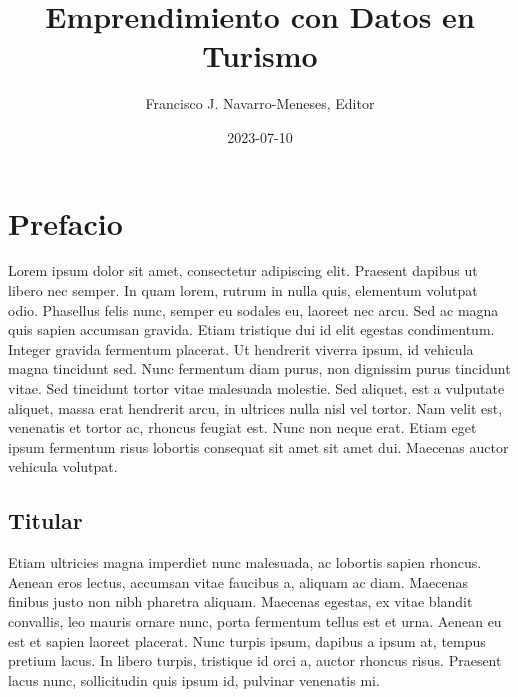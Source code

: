 \documentclass[
  letterpaper,
  DIV=11,
  numbers=noendperiod]{scrreprt}
\title{Emprendimiento con Datos en Turismo}
\author{Francisco J. Navarro-Meneses, Editor}
\date{2023-07-10}
\renewcommand*\contentsname{Table of contents}
\newcommand\contentsname{Table of contents}
\begin{document}
\maketitle
\ifdefined\Shaded\renewenvironment{Shaded}{\begin{tcolorbox}[interior hidden, enhanced, sharp corners, borderline west={3pt}{0pt}{shadecolor}, breakable, boxrule=0pt, frame hidden]}{\end{tcolorbox}}\fi

\renewcommand*\contentsname{Table of contents}
{
\hypersetup{linkcolor=}
\setcounter{tocdepth}{2}
\tableofcontents
}

\hypertarget{prefacio}{%
\chapter*{Prefacio}\label{prefacio}}


Lorem ipsum dolor sit amet, consectetur adipiscing elit. Praesent
dapibus ut libero nec semper. In quam lorem, rutrum in nulla quis,
elementum volutpat odio. Phasellus felis nunc, semper eu sodales eu,
laoreet nec arcu. Sed ac magna quis sapien accumsan gravida. Etiam
tristique dui id elit egestas condimentum. Integer gravida fermentum
placerat. Ut hendrerit viverra ipsum, id vehicula magna tincidunt sed.
Nunc fermentum diam purus, non dignissim purus tincidunt vitae. Sed
tincidunt tortor vitae malesuada molestie. Sed aliquet, est a vulputate
aliquet, massa erat hendrerit arcu, in ultrices nulla nisl vel tortor.
Nam velit est, venenatis et tortor ac, rhoncus feugiat est. Nunc non
neque erat. Etiam eget ipsum fermentum risus lobortis consequat sit amet
sit amet dui. Maecenas auctor vehicula volutpat.

\hypertarget{titular}{%
\section*{Titular}\label{titular}}


Etiam ultricies magna imperdiet nunc malesuada, ac lobortis sapien
rhoncus. Aenean eros lectus, accumsan vitae faucibus a, aliquam ac diam.
Maecenas finibus justo non nibh pharetra aliquam. Maecenas egestas, ex
vitae blandit convallis, leo mauris ornare nunc, porta fermentum tellus
est et urna. Aenean eu est et sapien laoreet placerat. Nunc turpis
ipsum, dapibus a ipsum at, tempus pretium lacus. In libero turpis,
tristique id orci a, auctor rhoncus risus. Praesent lacus nunc,
sollicitudin quis ipsum id, pulvinar venenatis mi.
\end{document}
